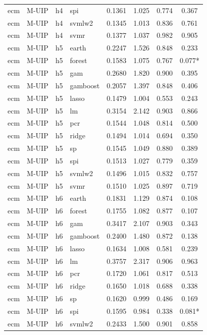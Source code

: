 \begin{ThreePartTable}
\begin{longtable}[t]{llclcccc}
ecm & M-UIP & h4 & spi & 0.1361 & 1.025 & 0.774 & 0.367\\
ecm & M-UIP & h4 & svmlw2 & 0.1345 & 1.013 & 0.836 & 0.761\\
ecm & M-UIP & h4 & svmr & 0.1377 & 1.037 & 0.982 & 0.905\\
\addlinespace
ecm & M-UIP & h5 & earth & 0.2247 & 1.526 & 0.848 & 0.233\\
ecm & M-UIP & h5 & forest & 0.1583 & 1.075 & 0.767 & 0.077*\\
ecm & M-UIP & h5 & gam & 0.2680 & 1.820 & 0.900 & 0.395\\
ecm & M-UIP & h5 & gamboost & 0.2057 & 1.397 & 0.848 & 0.406\\
ecm & M-UIP & h5 & lasso & 0.1479 & 1.004 & 0.553 & 0.243\\
ecm & M-UIP & h5 & lm & 0.3154 & 2.142 & 0.903 & 0.866\\
ecm & M-UIP & h5 & pcr & 0.1544 & 1.048 & 0.814 & 0.500\\
ecm & M-UIP & h5 & ridge & 0.1494 & 1.014 & 0.694 & 0.350\\
ecm & M-UIP & h5 & sp & 0.1545 & 1.049 & 0.880 & 0.389\\
ecm & M-UIP & h5 & spi & 0.1513 & 1.027 & 0.779 & 0.359\\
ecm & M-UIP & h5 & svmlw2 & 0.1496 & 1.015 & 0.832 & 0.757\\
ecm & M-UIP & h5 & svmr & 0.1510 & 1.025 & 0.897 & 0.719\\
\addlinespace
ecm & M-UIP & h6 & earth & 0.1831 & 1.129 & 0.874 & 0.108\\
ecm & M-UIP & h6 & forest & 0.1755 & 1.082 & 0.877 & 0.107\\
ecm & M-UIP & h6 & gam & 0.3417 & 2.107 & 0.903 & 0.343\\
ecm & M-UIP & h6 & gamboost & 0.2400 & 1.480 & 0.872 & 0.138\\
ecm & M-UIP & h6 & lasso & 0.1634 & 1.008 & 0.581 & 0.239\\
ecm & M-UIP & h6 & lm & 0.3757 & 2.317 & 0.906 & 0.963\\
ecm & M-UIP & h6 & pcr & 0.1720 & 1.061 & 0.817 & 0.513\\
ecm & M-UIP & h6 & ridge & 0.1650 & 1.018 & 0.688 & 0.338\\
ecm & M-UIP & h6 & sp & 0.1620 & 0.999 & 0.486 & 0.169\\
ecm & M-UIP & h6 & spi & 0.1595 & 0.984 & 0.338 & 0.081*\\
ecm & M-UIP & h6 & svmlw2 & 0.2433 & 1.500 & 0.901 & 0.858\\

\end{longtable}
\end{ThreePartTable}
